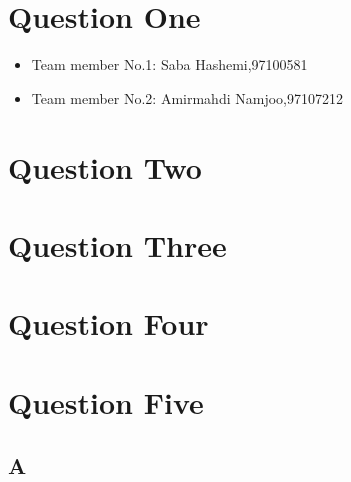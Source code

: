 \documentclass[12pt]{article}
\begin{document}
\section{Question One}

\begin{itemize}
	
	\item Team member No.1: Saba Hashemi,97100581
	\item Team member No.2: Amirmahdi Namjoo,97107212
\end{itemize}


\newpage

\section{Question Two}



\newpage

\section{Question Three}



\newpage


\section{Question Four}



\newpage


\section{Question Five}

\subsection{A}
\end{document}
